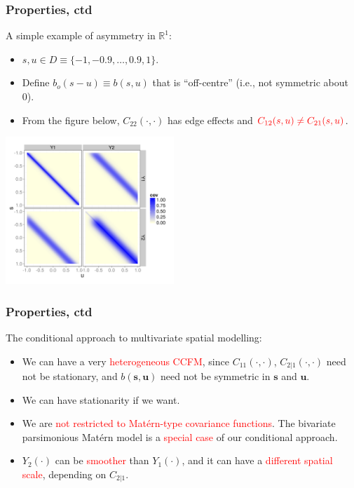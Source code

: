 \documentclass{beamer}
\newcommand{\svec} {\textbf{s}}
\newcommand{\uvec} {\textbf{u}}
\begin{document}

\begin{frame}
\frametitle{Properties, ctd}
\vspace{-.5cm}
A simple example of asymmetry in $\mathbb{R}^1$:
\begin{itemize}
\item $s,u \in D\equiv\{-1, -0.9 ,\dots,0.9, 1\}$.
\item Define $b_o(s-u) \equiv b(s,u)$ that is ``off-centre'' (i.e., not symmetric about 0).
\item From the figure below, $C_{22}(\cdot,\cdot)$ has edge effects and $\textcolor{red}{C_{12}(s,u)\neq C_{21}(s,u)}$.
\end{itemize}
\vspace{-.9cm}
\begin{center}
\hfill\includegraphics[width=2.5in]{Sigma.png}
\end{center}
\end{frame}


\begin{frame}
\frametitle{Properties, ctd}
The conditional approach to multivariate spatial modelling:
\begin{itemize}
\item We can have a very \textcolor{red}{heterogeneous CCFM}, since $C_{11}(\cdot,\cdot)$, $C_{2|1}(\cdot,\cdot)$ need not be stationary, and $b(\svec,\uvec)$ need not be symmetric in $\svec$ and $\uvec$. \vfill
\item We can have stationarity if we want.\vfill
\item We are \textcolor{red}{not restricted to Matérn-type covariance functions}. The bivariate parsimonious Matérn model is a \textcolor{red}{special case} of our conditional approach.\vfill
\item $Y_2(\cdot)$ can be \textcolor{red}{smoother} than $Y_1(\cdot)$, and it can have a \textcolor{red}{different spatial scale}, depending on $C_{2|1}$.\vfill

\end{itemize}
\end{frame}
\end{document}
